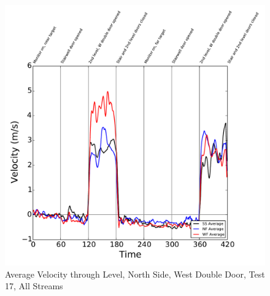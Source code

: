 \documentclass[12pt,oneside]{book}
\begin{document}
\begin{figure}[!ht]
\includegraphics[width=6in]{../../../Figures/Hose_Test_Figures/Test_17_West_063014_BDP_A13_Avg}
\caption{Average Velocity through  Level, North Side, West Double Door, Test 17, All Streams}
\label{fig:Test_17_BDP_A13_Avg_All}
\end{figure}

\clearpage
\end{document}
